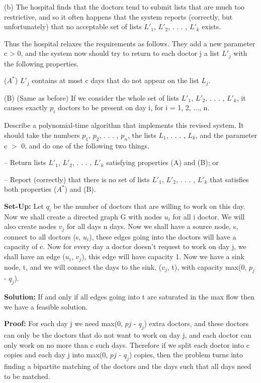 \documentclass{article}
\begin{document}
(b) The hospital finds that the doctors tend to submit lists that are much too
restrictive, and so it often happens that the system reports
(correctly, but unfortunately) that no acceptable set of lists $L'_1$, $L'_2$, . . . , $L'_k$
exists.

Thus the hospital relaxes the requirements as follows. They add a new
parameter c > 0, and the system now should try to return to each doctor
j a list $L'_j$ with the following properties.

($A^*$) $L'_j$ contains at most c days that do not appear on the list $L_j$.

(B) (Same as before) If we consider the whole set of lists $L'_1$, $L'_2$, . . . , $L'_k$,
it causes exactly $p_i$ doctors to be present on day i, for i = 1, 2, ..., n.

Describe a polynomial-time algorithm that implements this revised system.
It should take the numbers $p_1$, $p_2$, . . . , $p_n$, the lists $L_1$, . . . , $L_k$,
and the parameter c $>$ 0, and do one of the following two things.

– Return lists $L'_1$, $L'_2$, . . . , $L'_k$ satisfying properties (A) and (B); or

– Report (correctly) that there is no set of lists $L'_1$, $L'_2$, . . . , $L'_k$ that
satisfies both properties ($A^*$) and (B). \newline


\textbf{Set-Up:}  Let $q_i$ be the number of doctors that are willing to work on
this day.  Now we shall create a directed graph G with nodes $u_i$ for all i doctor.  We will
also create nodes $v_j$ for all days n days.  Now we shall have a source node, s,
connect to all doctors (s, $u_i$), these edges going into the doctors will have a capacity
 of c.  Now for every day a doctor doesn't request to work on day j, we shall have an edge
 ($u_i$, $v_j$), this edge will have capacity 1.  Now we have a sink node, t, and
 we will connect the days to the sink, ($v_j$, t), with capacity max(0, $p_j$ - $q_j$).

\textbf{Solution:} If and only if all edges going into t are saturated in the max flow
then we have a feasible solution.

\textbf{Proof:} For each day j we need max(0, $pj$ - $q_j$) extra doctors,
and these doctors can only be the doctors that do not want to work on day j,
and each doctor can only work on no more than c such days. Therefore if we split
each doctor into c copies and each day j into max(0, $pj$ - $q_j$)
copies, then the problem turns into finding a bipartite
matching of the doctors and the days such that all days need to be matched.
\end{document}
